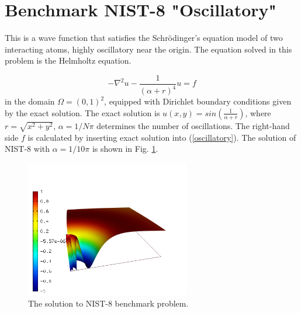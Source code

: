 \section{Benchmark NIST-8 "Oscillatory"}
\label{sec:bench-8}

This is a wave function that satisfies the Schr\"{o}dinger's equation model of two
interacting atoms, highly oscillatory near the origin.
The equation solved in this problem is the Helmholtz equation.

\begin{equation} \label{oscillatory}
-\nabla^{2} u - \frac{1}{(\alpha + r)^{4}} u = f
\end{equation}
in the domain $\Omega = (0, 1)^2$, equipped with Dirichlet boundary conditions
given by the exact solution. The exact solution is
$u(x,y) = sin(\frac{1}{\alpha + r})$,
where $r = \sqrt{x^{2} + y^{2}}$, $\alpha = 1 / N \pi$ determines the number of oscillations.
The right-hand side $f$ is calculated by inserting exact solution into (\ref{oscillatory}).
The solution of NIST-8 with $\alpha = 1 / 10 \pi$ is shown in Fig. \ref{fig:sln-nist08}.

\begin{figure}[!ht]
\centering
\includegraphics[height=6cm]{nist/nist-8/solution.png}
\caption{The solution to NIST-8 benchmark problem.}
\label{fig:sln-nist08}
\end{figure}

